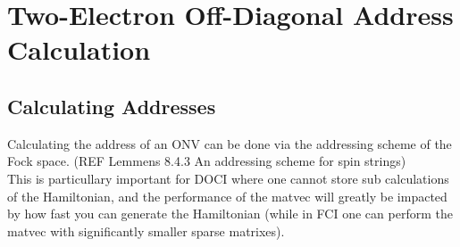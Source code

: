 
\section{Two-Electron Off-Diagonal Address Calculation}


\subsection{Calculating Addresses}
Calculating the address of an ONV can be done via the addressing scheme of the Fock space.
(REF Lemmens 8.4.3 An addressing scheme for spin strings) \\
This is particullary important for DOCI where one cannot store sub calculations of the Hamiltonian, and the performance of the matvec will greatly be impacted by how fast you can generate the Hamiltonian (while in FCI one can perform the matvec with significantly smaller sparse matrixes).
